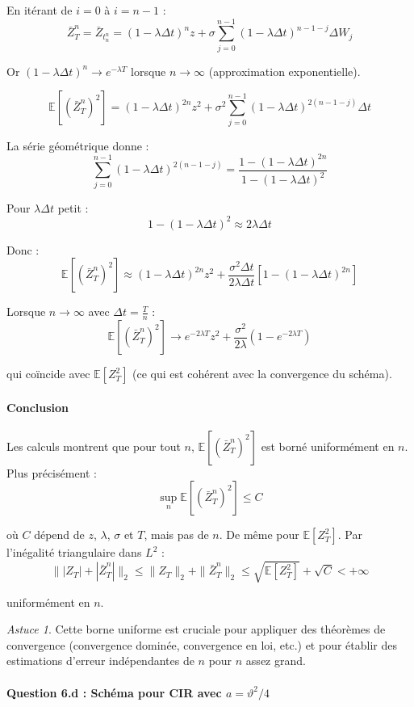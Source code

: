 \documentclass[12pt,a4paper]{article}
\theoremstyle{definition}
\theoremstyle{remark}
\newtheorem*{astuce}{Astuce}
\newcommand{\E}{\mathbb{E}}
\begin{document}
En itérant de $i = 0$ à $i = n-1$ :
\[
\bar{Z}_T^n = \bar{Z}_{t_n^n} = (1 - \lambda \Delta t)^n z + \sigma \sum_{j=0}^{n-1} (1 - \lambda \Delta t)^{n-1-j} \Delta W_j
\]

Or $(1 - \lambda \Delta t)^n \to e^{-\lambda T}$ lorsque $n \to \infty$ (approximation exponentielle).

\[
\E[(\bar{Z}_T^n)^2] = (1 - \lambda \Delta t)^{2n} z^2 + \sigma^2 \sum_{j=0}^{n-1} (1 - \lambda \Delta t)^{2(n-1-j)} \Delta t
\]

La série géométrique donne :
\[
\sum_{j=0}^{n-1} (1 - \lambda \Delta t)^{2(n-1-j)} = \frac{1 - (1 - \lambda \Delta t)^{2n}}{1 - (1 - \lambda \Delta t)^2}
\]

Pour $\lambda \Delta t$ petit :
\[
1 - (1 - \lambda \Delta t)^2 \approx 2\lambda \Delta t
\]

Donc :
\[
\E[(\bar{Z}_T^n)^2] \approx (1 - \lambda \Delta t)^{2n} z^2 + \frac{\sigma^2 \Delta t}{2\lambda \Delta t}[1 - (1 - \lambda \Delta t)^{2n}]
\]

Lorsque $n \to \infty$ avec $\Delta t = \frac{T}{n}$ :
\[
\E[(\bar{Z}_T^n)^2] \to e^{-2\lambda T}z^2 + \frac{\sigma^2}{2\lambda}(1 - e^{-2\lambda T})
\]

qui coïncide avec $\E[Z_T^2]$ (ce qui est cohérent avec la convergence du schéma).

\paragraph{Conclusion}

Les calculs montrent que pour tout $n$, $\E[(\bar{Z}_T^n)^2]$ est borné uniformément en $n$. Plus précisément :
\[
\sup_n \E[(\bar{Z}_T^n)^2] \leq C
\]

où $C$ dépend de $z$, $\lambda$, $\sigma$ et $T$, mais pas de $n$. De même pour $\E[Z_T^2]$. Par l'inégalité triangulaire dans $L^2$ :
\[
\||Z_T| + |\bar{Z}_T^n|\|_2 \leq \|Z_T\|_2 + \|\bar{Z}_T^n\|_2 \leq \sqrt{\E[Z_T^2]} + \sqrt{C} < +\infty
\]

uniformément en $n$.

\begin{astuce}
Cette borne uniforme est cruciale pour appliquer des théorèmes de convergence (convergence dominée, convergence en loi, etc.) et pour établir des estimations d'erreur indépendantes de $n$ pour $n$ assez grand.
\end{astuce}

\paragraph{Question 6.d : Schéma pour CIR avec $a = \vartheta^2/4$}
\end{document}
